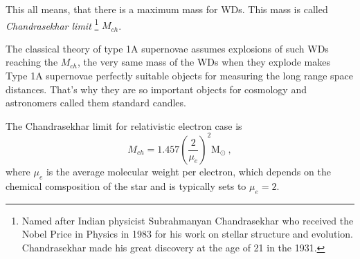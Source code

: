 \documentclass[oneside,a4paper,11pt]{report}
\begin{document}
This all means, that there is a maximum mass for WDs. This mass is called \textit{Chandrasekhar limit}
\footnote{Named after Indian physicist Subrahmanyan Chandrasekhar who received the Nobel Price in Physics in 1983 for his 
work on stellar structure and evolution. Chandrasekhar made his great discovery at the age of 21 in the 1931.   } $M_{ch}$.  

The classical theory of type 1A supernovae assumes explosions of such WDs reaching the $M_{ch}$, the very same 
mass of the WDs when they explode makes Type 1A supernovae perfectly suitable objects for measuring the long range 
space distances. That's why they are so important objects for cosmology and astronomers called 
them standard candles.

The Chandrasekhar limit for relativistic electron case is
\begin{equation}
 \label{chlim}
M_{ch}=1.457\left ( \frac{2}{\mu_e} \right )^2 \mathrm{M_{\odot}} \:,
\end{equation}
where $\mu_e$ is the average molecular weight per electron, which depends on the chemical comsposition of the star and is typically sets 
to $\mu_e = 2$. 
\end{document}
